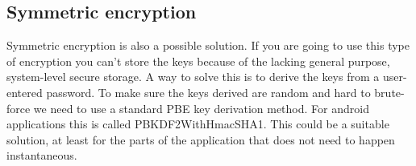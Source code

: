 \subsection{Symmetric encryption}
Symmetric encryption is also a possible solution. If you are going to use this type of encryption you can’t store the keys because of the lacking general purpose, system-level secure storage. A way to solve this is to derive the keys from a user-entered password. To make sure the keys derived are random and hard to brute-force we need to use a standard PBE key derivation method. For android applications this is called PBKDF2WithHmacSHA1.
\newline
\newline
This could be a suitable solution, at least for the parts of the application that does not need to happen instantaneous. 